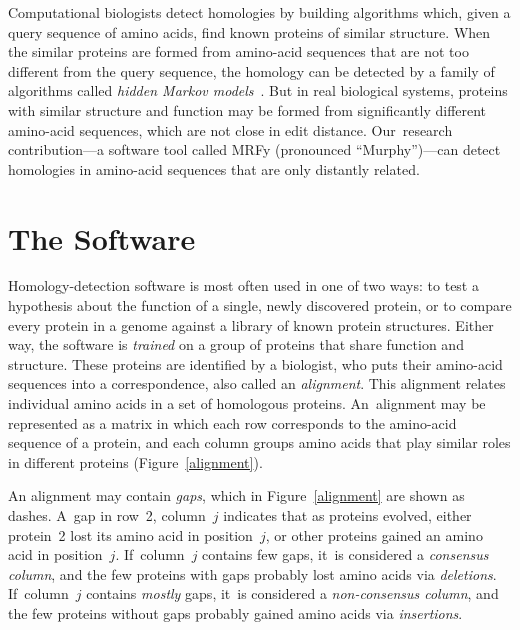 \documentclass[preprint,nonatbib,blockstyle,nocopyrightspace,times]{sigplanconf}
\newcommand\figref[1]{Figure~\ref{#1}}
\newcommand\secref[1]{Section~\ref{sec:#1}}
\let\cite\citep
\begin{document}
Computational biologists detect homologies by building 
algorithms which, given a {query sequence} of amino acids,
find known proteins of similar structure.
When the similar proteins are formed from amino-acid sequences that
are not too different from the query sequence, the homology can be
detected by
a family of algorithms called 
\textit{hidden Markov models}~\cite{Eddy:1998ut}.
But in real biological systems,
proteins with similar structure and function may be formed from significantly 
different amino-acid sequences, which are not close in edit distance.
Our~research contribution---a software tool called MRFy (pronounced
``Murphy'')---can detect homologies 
in amino-acid sequences that are only distantly related.
%
%

%
%
%


\section{The Software}



Homology-detection software is most often used in one of two ways:
to test a hypothesis about 
the function of a single, newly discovered protein, or 
to compare every protein in a genome against a library of known protein 
structures.
Either way, 
the software is \emph{trained}
on a group of proteins that share function and structure.
These proteins are identified by a biologist, who puts
their amino-acid sequences into a correspondence, also called an
\emph{alignment}. 
This alignment relates individual amino acids in a set of homologous proteins.
An~alignment may be represented as a matrix
in which each row corresponds to the amino-acid sequence of a protein,
and each column groups amino acids that play similar roles in
different proteins (Figure~\ref{alignment}).


An alignment may contain \emph{gaps}, which in 
\figref{alignment} are shown as dashes.
A~gap in row~2, column~$j$ indicates that as proteins evolved, either 
protein~2 lost its amino acid in position~$j$, or 
other proteins gained an amino acid in position~$j$.
If~column~$j$ contains few gaps, 
it~is considered a \emph{consensus column},
and the few proteins with gaps probably lost amino acids via
\emph{deletions}.
If~column~$j$ contains \emph{mostly} gaps, 
it~is considered a \emph{non-consensus column},
and the few proteins without gaps probably gained amino acids via
\emph{insertions}. 
\end{document}
